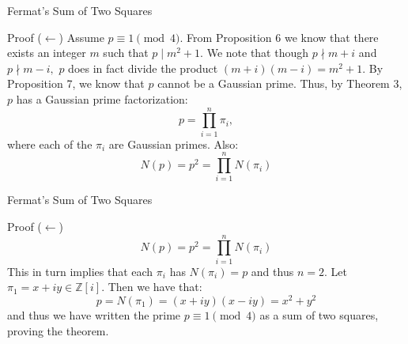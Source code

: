 \begin{frame}{Fermat’s Sum of Two Squares}
\begin{block}{Proof ($\leftarrow$)}
    Assume $p\equiv 1 \pmod 4.$ From Proposition 6 we know that there exists an integer $m$ such that $p\mid m^2+1.$ We note that though $p\nmid m+i$ and $p\nmid m-i,$ $p$ does in fact divide the product $(m+i)(m-i)=m^2+1.$ By Proposition 7, we know that $p$ cannot be a Gaussian prime. Thus, by Theorem 3, $p$ has a Gaussian prime factorization:  $$p=\prod_{i=1}^{n} \pi_i,$$ where each of the $\pi_i$ are Gaussian primes. Also: $$N(p)=p^2=\prod_{i=1}^{n} N(\pi_i)$$
\end{block}
\end{frame}

\begin{frame}{Fermat’s Sum of Two Squares}
\begin{block}{Proof ($\leftarrow$)}
$$N(p)=p^2=\prod_{i=1}^{n} N(\pi_i)$$
This in turn implies that each $\pi_i$ has $N(\pi_i)=p$ and thus $n=2.$ Let $\pi_1=x+iy\in\mathbb{Z}[i].$ Then we have that: $$p=N(\pi_1)=(x+iy)(x-iy)=x^2+y^2$$
and thus we have written the prime $p\equiv 1 \pmod 4$ as a sum of two squares, proving the theorem. 
    \end{block}
\end{frame}